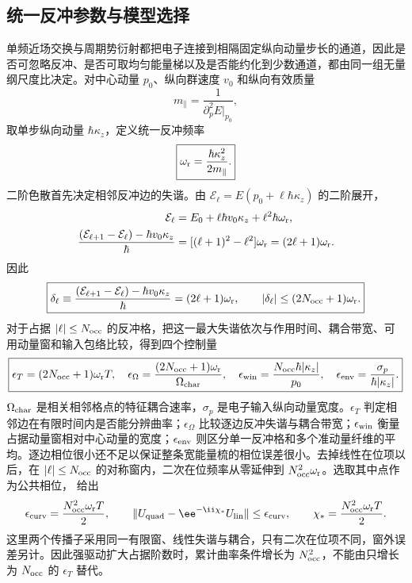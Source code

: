 
\subsection{统一反冲参数与模型选择}\label{subsec:recoil-regime-selection-dp47}

单频近场交换与周期势衍射都把电子连接到相隔固定纵向动量步长的通道，因此是否可忽略反冲、是否可取均匀能量梯以及是否能约化到少数通道，都由同一组无量纲尺度比决定。对中心动量 $p_0$、纵向群速度 $v_0$ 和纵向有效质量
\begin{equation*}
 m_\parallel=\frac{1}{\partial_p^2E|_{p_0}},
\end{equation*}
取单步纵向动量 $\hbar\kappa_z$，定义统一反冲频率
\begin{equation}
\boxed{\omega_{\rm r}=\frac{\hbar\kappa_z^2}{2m_\parallel}.}
\label{eq:unified_recoil_frequency_dp47}
\end{equation}
二阶色散首先决定相邻反冲边的失谐。由 $\mathcal E_\ell=E(p_0+\ell\hbar\kappa_z)$ 的二阶展开，
\begin{align*}
\mathcal E_\ell
&=E_0+\ell\hbar v_0\kappa_z+\ell^2\hbar\omega_{\rm r},\\
\frac{(\mathcal E_{\ell+1}-\mathcal E_\ell)-\hbar v_0\kappa_z}{\hbar}
&=[(\ell+1)^2-\ell^2]\omega_{\rm r}
=(2\ell+1)\omega_{\rm r}.
\end{align*}
因此
\begin{equation}
\boxed{
\delta_\ell
\equiv\frac{(\mathcal E_{\ell+1}-\mathcal E_\ell)-\hbar v_0\kappa_z}{\hbar}
=(2\ell+1)\omega_{\rm r},
\qquad
|\delta_\ell|\le(2N_{\rm occ}+1)\omega_{\rm r}.}
\label{eq:recoil_adjacent_detuning_bound_dp68}
\end{equation}
对于占据 $|\ell|\le N_{\rm occ}$ 的反冲格，把这一最大失谐依次与作用时间、耦合带宽、可用动量窗和输入包络比较，得到四个控制量
\begin{equation}
\boxed{
\epsilon_T=(2N_{\rm occ}+1)\omega_{\rm r}T,
\quad
\epsilon_\Omega=\frac{(2N_{\rm occ}+1)\omega_{\rm r}}{\Omega_{\rm char}},
\quad
\epsilon_{\rm win}=\frac{N_{\rm occ}\hbar|\kappa_z|}{p_0},
\quad
\epsilon_{\rm env}=\frac{\sigma_p}{\hbar|\kappa_z|}.}
\label{eq:recoil_regime_vector_dp47}
\end{equation}
$\Omega_{\rm char}$ 是相关相邻格点的特征耦合速率，$\sigma_p$ 是电子输入纵向动量宽度。$\epsilon_T$ 判定相邻边在有限时间内是否能分辨曲率；$\epsilon_\Omega$ 比较逐边反冲失谐与耦合带宽；$\epsilon_{\rm win}$ 衡量占据动量窗相对中心动量的宽度；$\epsilon_{\rm env}$ 则区分单一反冲格和多个准动量纤维的平均。逐边相位很小还不足以保证整条宽能量梳的相位误差很小。去掉线性在位项以后，在 $|\ell|\le N_{\rm occ}$ 的对称窗内，二次在位频率从零延伸到 $N_{\rm occ}^2\omega_{\rm r}$。选取其中点作为公共相位， 给出
\begin{equation}
\epsilon_{\rm curv}=\frac{N_{\rm occ}^2\omega_{\rm r}T}{2},\qquad
\|U_{\rm quad}-\ee^{-\ii\chi_*}U_{\rm lin}\|
\le\epsilon_{\rm curv},\qquad
\chi_*=\frac{N_{\rm occ}^2\omega_{\rm r}T}{2}.
\label{eq:recoil-window-curvature-phase}
\end{equation}
这里两个传播子采用同一有限窗、线性失谐与耦合，只有二次在位项不同，窗外误差另计。因此强驱动扩大占据阶数时，累计曲率条件增长为 $N_{\rm occ}^2$，不能由只增长为 $N_{\rm occ}$ 的 $\epsilon_T$ 替代。

